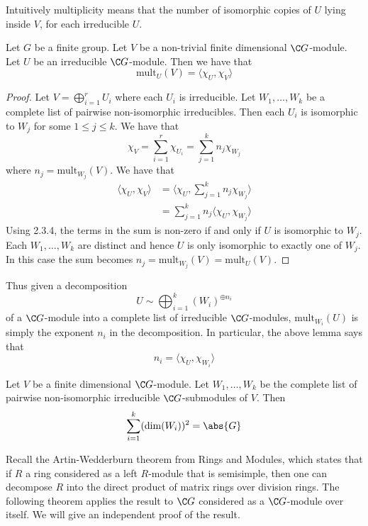 \documentclass[a4paper]{article}
\begin{document}
Intuitively multiplicity means that the number of isomorphic copies of $U$ lying inside $V$, for each irreducible $U$. 

\begin{lmm}{}{} Let $G$ be a finite group. Let $V$ be a non-trivial finite dimensional $\C G$-module. Let $U$ be an irreducible $\C G$-module. Then we have that $$\text{mult}_U(V)=\langle\chi_U,\chi_V\rangle$$ \tcbline
\begin{proof}
Let $V=\bigoplus_{i=1}^rU_i$ where each $U_i$ is irreducible. Let $W_1,\dots,W_k$ be a complete list of pairwise non-isomorphic irreducibles. Then each $U_i$ is isomorphic to $W_j$ for some $1\leq j\leq k$. We have that $$\chi_V=\sum_{i=1}^r\chi_{U_i}=\sum_{j=1}^kn_j\chi_{W_j}$$ where $n_j=\text{mult}_{W_j}(V)$. We have that 
\begin{align*}
\langle\chi_U,\chi_V\rangle&=\langle\chi_U,\sum_{j=1}^kn_j\chi_{W_j}\rangle\\
&=\sum_{j=1}^kn_j\langle\chi_U,\chi_{W_j}\rangle
\end{align*}
Using 2.3.4, the terms in the sum is non-zero if and only if $U$ is isomorphic to $W_j$. Each $W_1,\dots,W_k$ are distinct and hence $U$ is only isomorphic to exactly one of $W_j$. In this case the sum becomes $n_j=\text{mult}_{W_j}(V)=\text{mult}_{U}(V)$. 
\end{proof}
\end{lmm}

Thus given a decomposition $$U\sim\bigoplus_{i=1}^k(W_i)^{\oplus n_i}$$ of a $\C G$-module into a complete list of irreducible $\C G$-modules, $\text{mult}_{W_i}(U)$ is simply the exponent $n_i$ in the decomposition. In particular, the above lemma says that $$n_i=\langle\chi_U,\chi_{W_i}\rangle$$

\begin{lmm}{}{} Let $V$ be a finite dimensional $\C G$-module. Let $W_1,\dots, W_k$ be the complete list of pairwise non-isomorphic irreducible $\C G$-submodules of $V$. Then $$\sum_{i=1}^k(\dim(W_i))^2=\abs{G}$$
\end{lmm}

Recall the Artin-Wedderburn theorem from Rings and Modules, which states that if $R$ a ring considered as a left $R$-module that is semisimple, then one can decompose $R$ into the direct product of matrix rings over division rings. The following theorem applies the result to $\C G$ considered as a $\C G$-module over itself. We will give an independent proof of the result. 
\end{document}
